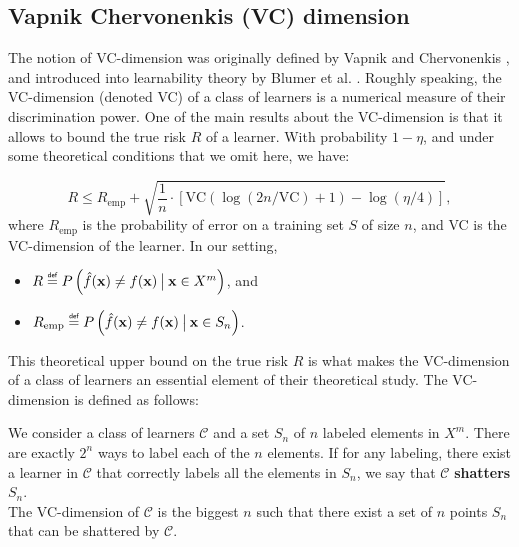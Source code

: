 \subsection{Vapnik Chervonenkis (VC) dimension}
\label{SEC:VCdim}
The notion of VC-dimension was originally defined by Vapnik and Chervonenkis
\cite{Vap98}, and introduced into learnability theory by Blumer et al.
\cite{BluEhrHauWarACM89}. Roughly speaking, the VC-dimension (denoted VC) of a class of
learners is a numerical measure of their discrimination power. One of the main
results about the VC-dimension is that it allows to bound the true risk $R$ of
a learner. With probability $1 - \eta$, and under some theoretical conditions
that we omit here, we have:

$$R \leq R_{\text{emp}} + \sqrt{\frac{1}{n} \cdot \left[\text{VC}(\log(2n /
\text{VC}) + 1) - \log(\eta/4)\right]},$$
where $R_\text{emp}$ is the probability of error on a training set $S$ of size
$n$, and VC is the VC-dimension of the learner. In our setting,
\begin{itemize}
  \item $R \eqdef P\left(\hat{f}(\mathbf{x}) \neq f(\mathbf{x}) \given[\big]
    \mathbf{x} \in X^m\right)$, and
  \item $R_\text{emp} \eqdef P\left(\hat{f}(\mathbf{x}) \neq f(\mathbf{x})
    \given[\big] \mathbf{x} \in S_n\right)$.
\end{itemize}

This theoretical upper bound on the true risk $R$ is what makes the
VC-dimension of a class of learners an essential element of their theoretical
study. The VC-dimension is defined as follows:

\begin{definition}
  \label{DEF:VCdim}
  We consider a class of learners $\mathcal{C}$ and a set $S_n$ of $n$ labeled
  elements in $X^m$. There are exactly $2^n$ ways to label each of the $n$
  elements. If for any labeling, there exist a learner in $\mathcal{C}$ that
  correctly labels all the elements in $S_n$, we say that $\mathcal{C}$
  \textbf{shatters} $S_n$.\\

  The VC-dimension of $\mathcal{C}$ is the biggest $n$ such that there exist a
  set of $n$ points $S_n$ that can be shattered by $\mathcal{C}$.
\end{definition}


